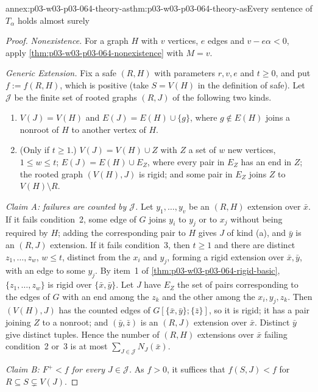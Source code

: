 \begin{annexitem}{annex:p03-w03-p03-064-theory-as}{thm:p03-w03-p03-064-theory-as}{Every sentence of \(T_\alpha\) holds almost surely}
\begin{proof}
\emph{Nonexistence.}  For a graph \(H\) with \(v\) vertices, \(e\) edges and
\(v-e\alpha<0\), apply \cref{thm:p03-w03-p03-064-nonexistence} with
\(M=v\).

\emph{Generic Extension.}  Fix a safe \((R,H)\) with parameters \(r,v,e\)
and \(t\geq0\), and put \(f:=f(R,H)\), which is positive (take
\(S=V(H)\) in the definition of safe).  Let \(\mathcal J\) be the finite set
of rooted graphs \((R,J)\) of the following two kinds.
\begin{enumerate}
\item[(a)] \(V(J)=V(H)\) and \(E(J)=E(H)\cup\{g\}\), where \(g\notin E(H)\)
  joins a nonroot of \(H\) to another vertex of \(H\).
\item[(b)] (Only if \(t\geq1\).)  \(V(J)=V(H)\cup Z\) with \(Z\) a set of
  \(w\) new vertices, \(1\leq w\leq t\); \(E(J)=E(H)\cup E_Z\), where every
  pair in \(E_Z\) has an end in \(Z\); the rooted graph \((V(H),J)\) is
  rigid; and some pair in \(E_Z\) joins \(Z\) to \(V(H)\setminus R\).
\end{enumerate}

\emph{Claim A: failures are counted by \(\mathcal J\).}  Let
\(y_1,\ldots,y_v\) be an \((R,H)\) extension over \(\bar x\).  If it fails
condition~2, some edge of \(G\) joins \(y_i\) to \(y_j\) or to \(x_j\) without
being required by \(H\); adding the corresponding pair to \(H\) gives \(J\)
of kind (a), and \(\bar y\) is an \((R,J)\) extension.  If it fails
condition~3, then \(t\geq1\) and there are distinct \(z_1,\ldots,z_w\),
\(w\leq t\), distinct from the \(x_i\) and \(y_j\), forming a rigid extension
over \(\bar x,\bar y\), with an edge to some \(y_j\).  By item~1 of
\cref{thm:p03-w03-p03-064-rigid-basic}, \(\{z_1,\ldots,z_w\}\) is rigid over
\(\{\bar x,\bar y\}\).  Let \(J\) have \(E_Z\) the set of pairs corresponding
to the edges of \(G\) with an end among the \(z_k\) and the other among the
\(x_i,y_j,z_k\).  Then \((V(H),J)\) has the counted edges of
\(G[\{\bar x,\bar y\};\{\bar z\}]\), so it is rigid; it has a pair joining
\(Z\) to a nonroot; and \((\bar y,\bar z)\) is an \((R,J)\) extension over
\(\bar x\).  Distinct \(\bar y\) give distinct tuples.  Hence the number of
\((R,H)\) extensions over \(\bar x\) failing condition~2 or~3 is at most
\(\sum_{J\in\mathcal J}N_J(\bar x)\).

\emph{Claim B: \(F^+<f\) for every \(J\in\mathcal J\).}  As \(f>0\), it
suffices that \(f(S,J)<f\) for \(R\subseteq S\subsetneq V(J)\).


\end{proof}
\end{annexitem}
